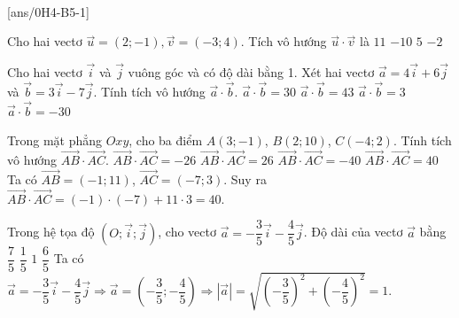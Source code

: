 \baitaptn
{} \\
\setcounter{ex}{0}
[ans/0H4-B5-1]

\begin{ex}%
	Cho hai vectơ $\overrightarrow{u}=(2;-1),\overrightarrow{v}=(-3;4)$. Tích vô hướng $\overrightarrow{u} \cdot \overrightarrow{v}$ là 
	\choice
	{$11$}
	{\True $-10$}
	{$5$}
	{$-2$}
\end{ex}

\begin{ex}%
	Cho hai vectơ $\vec{i}$ và $\vec{j}$ vuông góc và có độ dài bằng 1. Xét hai vectơ $\vec{a}=4\vec{i}+6\vec{j}$ và $\vec{b}=3\vec{i}-7\vec{j}$. Tính tích vô hướng $\vec{a}\cdot\vec{b}$.
	\choice
	{$\vec{a}\cdot\vec{b}=30$}
	{$\vec{a}\cdot\vec{b}=43$}
	{$\vec{a}\cdot\vec{b}=3$}
	{\True $\vec{a}\cdot\vec{b}=-30$}
	\loigiai
	{}
\end{ex}

\begin{ex}%
	Trong mặt phẳng $Oxy$, cho ba điểm $A(3;-1 )$, $B(2;10 )$, $C(-4;2 )$. Tính tích vô hướng $\overrightarrow{AB}\cdot\overrightarrow{AC}$.
	\choice
	{$\overrightarrow{AB}\cdot\overrightarrow{AC}=-26$}
	{$\overrightarrow{AB}\cdot\overrightarrow{AC}=26$}
	{$\overrightarrow{AB}\cdot\overrightarrow{AC}=-40$}
	{\True $\overrightarrow{AB}\cdot\overrightarrow{AC}=40$}
	\loigiai
	{Ta có $\overrightarrow{AB}=(-1;11 )$, $\overrightarrow{AC}=(-7;3 )$.
		Suy ra $\overrightarrow{AB}\cdot\overrightarrow{AC}=(-1 )\cdot (-7 )+11\cdot 3=40$. }
\end{ex}


\begin{ex}%
	Trong hệ tọa độ $(O;\overrightarrow{i};\overrightarrow{j} )$, cho vectơ $\overrightarrow{a}=-\dfrac{3}{5}\overrightarrow{i}-\dfrac{4}{5}\overrightarrow{j}$. Độ dài của vectơ $\overrightarrow{a}$ bằng
	\choice
	{$\dfrac{7}{5}$}
	{$\dfrac{1}{5}$}
	{\True $1$}
	{$\dfrac{6}{5}$}
	\loigiai
	{Ta có $\overrightarrow{a}=-\dfrac{3}{5}\overrightarrow{i}-\dfrac{4}{5}\overrightarrow{j}\Rightarrow\overrightarrow{a}=(-\dfrac{3}{5};-\dfrac{4}{5} )\Rightarrow \left| {\overrightarrow{a}} \right|=\sqrt{(-\dfrac{3}{5} )^2+(-\dfrac{4}{5} )^2}=1$. }
\end{ex}

